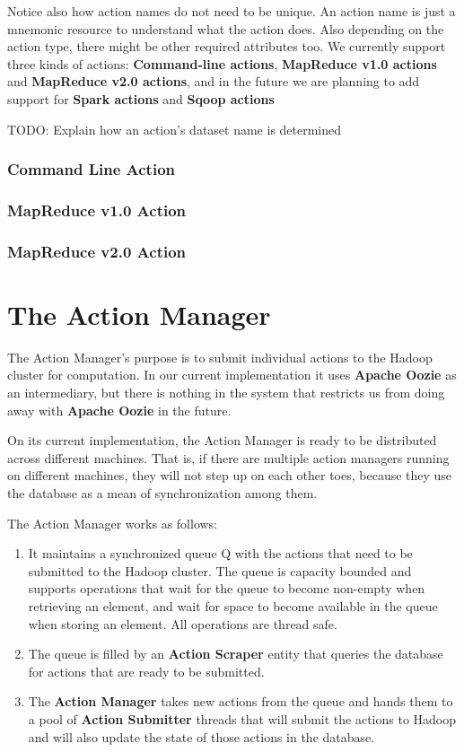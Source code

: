 Notice also how action names do not need to be unique. An action name is just a mnemonic resource to understand what the action does. Also depending on the action type, there might be other required attributes too. We currently support three kinds of actions: \textbf{Command-line actions}, \textbf{MapReduce v1.0 actions} and \textbf{MapReduce v2.0 actions}, and in the future we are planning to add support for \textbf{Spark actions} and \textbf{Sqoop actions}

TODO: Explain how an action's dataset name is determined

\subsubsection{Command Line Action}
\subsubsection{MapReduce v1.0 Action}
\subsubsection{MapReduce v2.0 Action}

\section{The Action Manager}
The Action Manager's purpose is to submit individual actions to the Hadoop cluster for computation. In our current implementation it uses \textbf{Apache Oozie} as an intermediary, but there is nothing in the system that restricts us from doing away with \textbf{Apache Oozie} in the future.

On its current implementation, the Action Manager is ready to be distributed across different machines. That is, if there are multiple action managers running on different machines, they will not step up on each other toes, because they use the database as a mean of synchronization among them.

The Action Manager works as follows:

\begin{enumerate}
\item It maintains a synchronized queue Q with the actions that need to be submitted to the Hadoop cluster. The queue is capacity bounded and supports operations that wait for the queue to become non-empty when retrieving an element, and wait for space to become available in the queue when storing an element. All operations are thread safe.
\item The queue is filled by an \textbf{Action Scraper} entity that queries the database for actions that are ready to be submitted.
\item The \textbf{Action Manager} takes new actions from the queue and hands them to a pool of \textbf{Action Submitter} threads that will submit the actions to Hadoop and will also update the state of those actions in the database.
\end{enumerate}


